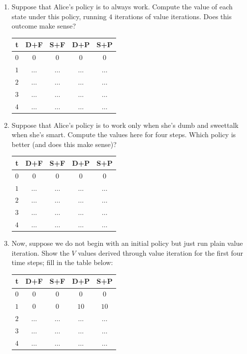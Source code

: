 \documentclass[fleqn]{hw}
\begin{document}
\begin{enumerate}

\item Suppose that Alice's policy is to always work.  Compute the value
of each state under this policy, running $4$ iterations of value
iterations.  Does this outcome make sense?

\begin{tabular}{|c||c|c|c|c|}
\hline
{\bf t} & D+F & S+F & D+P & S+P \\
\hline
$0$ & $0$ & $0$ & $0$  & $0$  \\
\hline
$1$ & $\dots$ & $\dots$ & $\dots$ & $\dots$ \\
\hline
$2$ & $\dots$ & $\dots$ & $\dots$ & $\dots$ \\
\hline
$3$ & $\dots$ & $\dots$ & $\dots$ & $\dots$ \\
\hline
$4$ & $\dots$ & $\dots$ & $\dots$ & $\dots$ \\
\hline
\end{tabular}

\item Suppose that Alice's policy is to work only when she's dumb and sweettalk when she's smart.
Compute the values here for four steps.  Which policy is better (and
does this make sense)?


\begin{tabular}{|c||c|c|c|c|}
\hline
{\bf t} & D+F & S+F & D+P & S+P \\
\hline
$0$ & $0$ & $0$ & $0$  & $0$  \\
\hline
$1$ & $\dots$ & $\dots$ & $\dots$ & $\dots$ \\
\hline
$2$ & $\dots$ & $\dots$ & $\dots$ & $\dots$ \\
\hline
$3$ & $\dots$ & $\dots$ & $\dots$ & $\dots$ \\
\hline
$4$ & $\dots$ & $\dots$ & $\dots$ & $\dots$ \\
\hline
\end{tabular}

\item Now, suppose we do not begin with an initial policy but just run
plain value iteration.  Show the $V$ values derived through value
iteration for the first four time steps; fill in the table below:

\begin{tabular}{|c||c|c|c|c|}
\hline
{\bf t} & D+F & S+F & D+P & S+P \\
\hline
$0$ & $0$ & $0$ & $0$  & $0$  \\
\hline
$1$ & $0$ & $0$ & $10$ & $10$ \\
\hline
$2$ & $\dots$ & $\dots$ & $\dots$ & $\dots$ \\
\hline
$3$ & $\dots$ & $\dots$ & $\dots$ & $\dots$ \\
\hline
$4$ & $\dots$ & $\dots$ & $\dots$ & $\dots$ \\
\hline
\end{tabular}


\end{enumerate}
\end{document}
